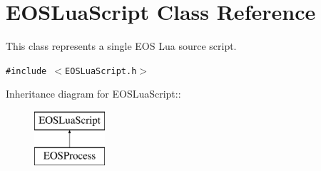\hypertarget{classEOSLuaScript}{
\section{EOSLuaScript Class Reference}
\label{classEOSLuaScript}
}
This class represents a single EOS Lua source script.  


{\tt \#include $<$EOSLuaScript.h$>$}

Inheritance diagram for EOSLuaScript::\begin{figure}[H]
\begin{center}
\leavevmode
\includegraphics[height=2cm]{classEOSLuaScript}
\end{center}
\end{figure}
